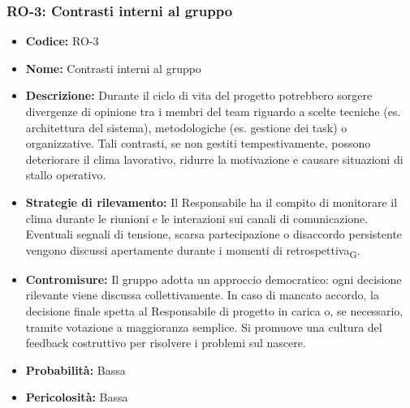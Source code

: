 \documentclass[a4paper, 10pt, colorlinks=true, linkcolor=black, urlcolor=blue, citecolor=blue, hidelinks]{article}
\begin{document}
\subsubsection{RO-3: Contrasti interni al gruppo}
\begin{itemize}
    \item \textbf{Codice:} RO-3 
    \item \textbf{Nome:} Contrasti interni al gruppo

    \item \textbf{Descrizione:} Durante il ciclo di vita del progetto potrebbero sorgere divergenze di opinione tra i membri del team riguardo a scelte tecniche (es. architettura del sistema), metodologiche (es. gestione dei task) o organizzative. Tali contrasti, se non gestiti tempestivamente, possono deteriorare il clima lavorativo, ridurre la motivazione e causare situazioni di stallo operativo.

    \item \textbf{Strategie di rilevamento:} Il Responsabile ha il compito di monitorare il clima durante le riunioni e le interazioni sui canali di comunicazione. Eventuali segnali di tensione, scarsa partecipazione o disaccordo persistente vengono discussi apertamente durante i momenti di retrospettiva\textsubscript{G}.

    \item \textbf{Contromisure:} Il gruppo adotta un approccio democratico: ogni decisione rilevante viene discussa collettivamente. In caso di mancato accordo, la decisione finale spetta al Responsabile di progetto in carica o, se necessario, tramite votazione a maggioranza semplice. Si promuove una cultura del feedback costruttivo per risolvere i problemi sul nascere.

    \item \textbf{Probabilità:} Bassa

    \item \textbf{Pericolosità:} Bassa
\end{itemize}
\end{document}
